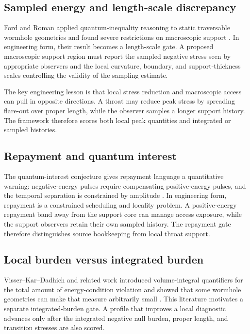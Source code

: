 \documentclass[11pt]{article}
\begin{document}
\subsection{Sampled energy and length-scale discrepancy}

Ford and Roman applied quantum-inequality reasoning to static traversable wormhole geometries and found severe restrictions on macroscopic support \citep{ford_roman_1996}.  In engineering form, their result becomes a length-scale gate.  A proposed macroscopic support region must report the sampled negative stress seen by appropriate observers and the local curvature, boundary, and support-thickness scales controlling the validity of the sampling estimate.

The key engineering lesson is that local stress reduction and macroscopic access can pull in opposite directions.  A throat may reduce peak stress by spreading flare-out over proper length, while the observer samples a longer support history.  The framework therefore scores both local peak quantities and integrated or sampled histories.

\subsection{Repayment and quantum interest}

The quantum-interest conjecture gives repayment language a quantitative warning: negative-energy pulses require compensating positive-energy pulses, and the temporal separation is constrained by amplitude \citep{ford_roman_1999}.  In engineering form, repayment is a constrained scheduling and locality problem.  A positive-energy repayment band away from the support core can manage access exposure, while the support observers retain their own sampled history.  The repayment gate therefore distinguishes source bookkeeping from local throat support.

\subsection{Local burden versus integrated burden}

Visser--Kar--Dadhich and related work introduced volume-integral quantifiers for the total amount of energy-condition violation and showed that some wormhole geometries can make that measure arbitrarily small \citep{visser_kar_dadhich_2003,kar_dadhich_visser_2004}.  This literature motivates a separate integrated-burden gate.  A profile that improves a local diagnostic advances only after the integrated negative null burden, proper length, and transition stresses are also scored.
\end{document}
